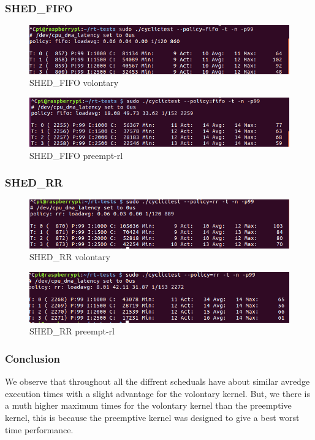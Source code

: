 \documentclass[10pt,a4paper]{article}
\begin{document}
\subsubsection{SHED\_FIFO}
\begin{figure}[H]
\includegraphics[width=16cm]{Voluntary-Fifo-WithoutHackbench.png}
\caption{SHED\_FIFO volontary}
\end{figure}
\begin{figure}[H]
\includegraphics[width=16cm]{Preempt-Fifo-WithoutHackbench.png}
\caption{SHED\_FIFO preempt-rl}
\end{figure}
\subsubsection{SHED\_RR}
\begin{figure}[h]
\includegraphics[width=16cm]{Voluntary-RR-WithoutHackbench.png}
\caption{SHED\_RR volontary}
\end{figure}
\begin{figure}[H]
\includegraphics[width=16cm]{Preempt-RR-WithoutHackbench.png}
\caption{SHED\_RR preempt-rl}
\end{figure}
\subsubsection{Conclusion}
We observe that throughout all the diffrent scheduals have about similar avredge execution times with a slight advantage for the volontary kernel. But, we there is a muth higher maximum times for the volontary kernel than the preemptive kernel, this is because the preemptive kernel was designed to give a best worst time performance.
\end{document}
